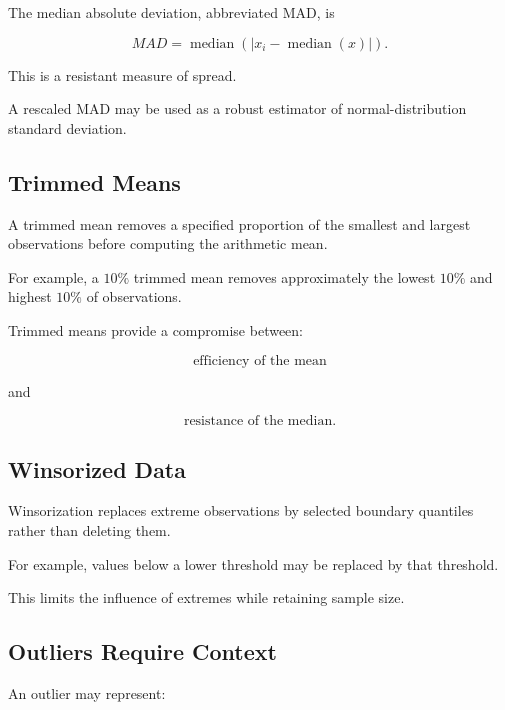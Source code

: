 The median absolute deviation, abbreviated MAD, is

\[
\boxed{
MAD
=
\operatorname{median}
\left(
|x_i-\operatorname{median}(x)|
\right).
}
\]

This is a resistant measure of spread.

A rescaled MAD may be used as a robust estimator of normal-distribution
standard deviation.

\subsection{Trimmed Means}
\label{subsec:trimmed-means}

A trimmed mean removes a specified proportion of the smallest and
largest observations before computing the arithmetic mean.

For example, a \(10\%\) trimmed mean removes approximately the lowest
\(10\%\) and highest \(10\%\) of observations.

Trimmed means provide a compromise between:

\[
\boxed{
\text{efficiency of the mean}
}
\]

and

\[
\boxed{
\text{resistance of the median}.
}
\]

\subsection{Winsorized Data}
\label{subsec:winsorized-data}

Winsorization replaces extreme observations by selected boundary
quantiles rather than deleting them.

For example, values below a lower threshold may be replaced by that
threshold.

This limits the influence of extremes while retaining sample size.

\subsection{Outliers Require Context}
\label{subsec:outliers-context}

An outlier may represent:

